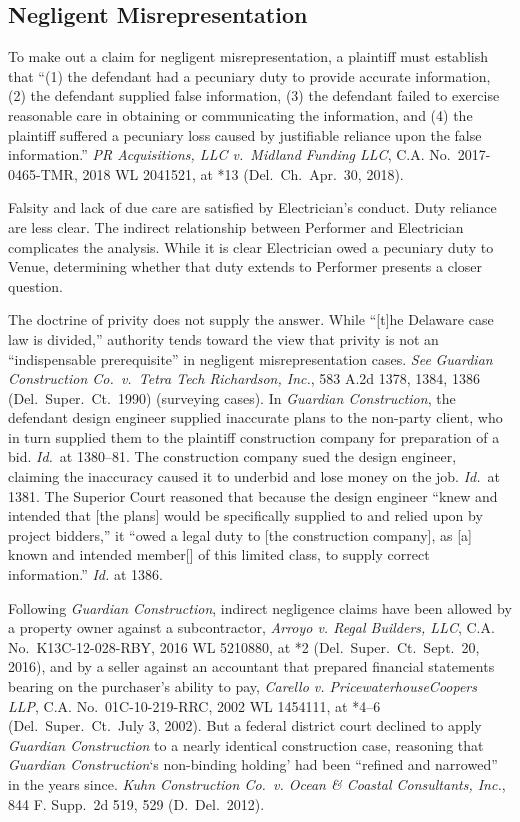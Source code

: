 \documentclass[
  12pt,
  letterpaper,
]{scrartcl}
\begin{document}
\hypertarget{negligent-misrepresentation}{%
\subsection{Negligent
Misrepresentation}\label{negligent-misrepresentation}}

To make out a claim for negligent misrepresentation, a plaintiff must
establish that ``(1) the defendant had a pecuniary duty to provide
accurate information, (2) the defendant supplied false information, (3)
the defendant failed to exercise reasonable care in obtaining or
communicating the information, and (4) the plaintiff suffered a
pecuniary loss caused by justifiable reliance upon the false
information.'' \emph{PR Acquisitions, LLC v.~Midland Funding LLC}, C.A.
No.~2017-0465-TMR, 2018 WL 2041521, at *13 (Del.~Ch.~Apr.~30, 2018).

Falsity and lack of due care are satisfied by Electrician's conduct.
Duty reliance are less clear. The indirect relationship between
Performer and Electrician complicates the analysis. While it is clear
Electrician owed a pecuniary duty to Venue, determining whether that
duty extends to Performer presents a closer question.

The doctrine of privity does not supply the answer. While ``{[}t{]}he
Delaware case law is divided,'' authority tends toward the view that
privity is not an ``indispensable prerequisite'' in negligent
misrepresentation cases. \emph{See} \emph{Guardian Construction Co.~v.~Tetra Tech Richardson, Inc.},
583 A.2d 1378, 1384, 1386 (Del.~Super.~Ct.~1990) (surveying cases). In \emph{Guardian Construction},
the defendant design engineer supplied inaccurate plans to the
non-party client, who in turn supplied them to the plaintiff
construction company for preparation of a bid. \emph{Id.}~at 1380--81.
The construction company sued the design engineer, claiming the
inaccuracy caused it to underbid and lose money on the job. \emph{Id.}~at 1381. The Superior Court reasoned that because the design engineer
``knew and intended that {[}the plans{]} would be specifically supplied
to and relied upon by project bidders,'' it ``owed a legal duty to
{[}the construction company{]}, as {[}a{]} known and intended
member{[}{]} of this limited class, to supply correct information.''
\emph{Id.} at 1386.

Following \emph{Guardian Construction}, indirect negligence claims have
been allowed by a property owner against a subcontractor, \emph{Arroyo
v. Regal Builders, LLC}, C.A. No.~K13C-12-028-RBY, 2016 WL 5210880, at
*2 (Del.~Super.~Ct.~Sept.~20, 2016), and by a seller against an
accountant that prepared financial statements bearing on the purchaser's
ability to pay, \emph{Carello v. PricewaterhouseCoopers LLP}, C.A.
No.~01C-10-219-RRC, 2002 WL 1454111, at *4--6 (Del.~Super.~Ct.~July 3,
2002). But a federal district court declined to apply \emph{Guardian
Construction} to a nearly identical construction case, reasoning that
\emph{Guardian Construction}`s non-binding holding' had been ``refined
and narrowed'' in the years since. \emph{Kuhn Construction Co.~v. Ocean
\& Coastal Consultants, Inc.}, 844 F. Supp.~2d 519, 529 (D.~Del.~2012).
\end{document}
